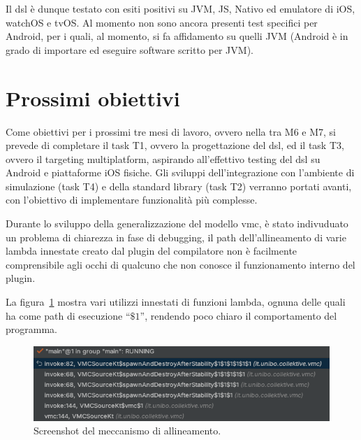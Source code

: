 \documentclass[13pt, a4paper]{article}
\begin{document}
Il \ac{dsl} è dunque testato con esiti positivi su JVM, JS, Nativo ed emulatore di iOS, watchOS e tvOS.
%
Al momento non sono ancora presenti test specifici per Android,
per i quali, al momento,
si fa affidamento su quelli \ac{JVM}
(Android è in grado di importare ed eseguire software scritto per \ac{JVM}).

\section{Prossimi obiettivi}\label{sec:prossimi-obiettivi}


Come obiettivi per i prossimi tre mesi di lavoro, ovvero nella  tra M6 e M7,
    si prevede di completare il task T1, ovvero la progettazione del \ac{dsl},
    ed il task T3, ovvero il targeting multiplatform,
    aspirando all'effettivo testing del \ac{dsl} su Android e piattaforme iOS fisiche.
%
Gli sviluppi dell'integrazione con l'ambiente di simulazione (task T4) e della standard library (task T2) verranno portati
    avanti, con l'obiettivo di implementare funzionalità più complesse.

Durante lo sviluppo della generalizzazione del modello \ac{vmc}, è stato indivuduato un problema di chiarezza in fase di debugging,
il path dell'allineamento di varie lambda innestate creato dal plugin del compilatore non è facilmente comprensibile
agli occhi di qualcuno che non conosce il funzionamento interno del plugin.

La figura~\ref{fig:alignment} mostra vari utilizzi innestati di funzioni lambda, ognuna delle quali ha come path di esecuzione
``$\$1$'', rendendo poco chiaro il comportamento del programma.
\begin{figure}
    \centering
    \includegraphics[width=\textwidth]{images/alignment}
    \caption{Screenshot del meccanismo di allineamento.}
    \label{fig:alignment}
\end{figure}
\end{document}
